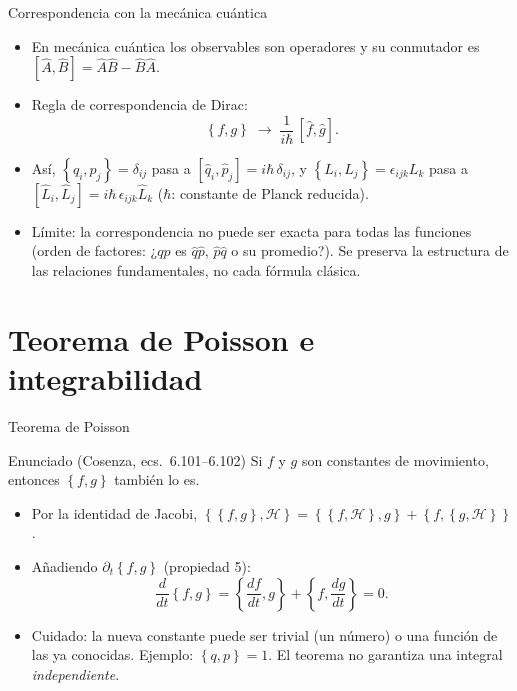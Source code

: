 \documentclass[spanish]{beamer}
\newcommand{\Ham}{\mathcal{H}}
\newcommand{\pb}[2]{\left\{#1,#2\right\}}   %
\begin{document}
\begin{frame}{Correspondencia con la mecánica cuántica}
\begin{itemize}
  \item<1-> En mecánica cuántica los observables son operadores y su conmutador es
        $[\hat A,\hat B] = \hat A\hat B - \hat B\hat A$.
  \item<2-> Regla de correspondencia de Dirac:
  \[
    \pb{f}{g} \;\longrightarrow\; \frac{1}{i\hbar}\,[\hat f,\hat g] .
  \]
  \item<3-> Así, $\pb{q_i}{p_j} = \delta_{ij}$ pasa a
        $[\hat q_i,\hat p_j] = i\hbar\,\delta_{ij}$, y
        $\pb{L_i}{L_j} = \epsilon_{ijk}L_k$ pasa a
        $[\hat L_i,\hat L_j] = i\hbar\,\epsilon_{ijk}\hat L_k$
        ($\hbar$: constante de Planck reducida).
  \item<4-> \alert{Límite:} la correspondencia no puede ser exacta para todas las
        funciones (orden de factores: ¿$qp$ es $\hat q\hat p$, $\hat p\hat q$ o su
        promedio?). Se preserva la estructura de las relaciones fundamentales,
        no cada fórmula clásica.
\end{itemize}
\end{frame}

\section{Teorema de Poisson e integrabilidad}

\begin{frame}{Teorema de Poisson}
\begin{block}{Enunciado (Cosenza, ecs.~6.101--6.102)}
Si $f$ y $g$ son constantes de movimiento, entonces $\pb{f}{g}$ también lo es.
\end{block}
\begin{itemize}
  \item<2-> Por la identidad de Jacobi,
        $\pb{\pb{f}{g}}{\Ham} = \pb{\pb{f}{\Ham}}{g} + \pb{f}{\pb{g}{\Ham}}$.
  \item<3-> Añadiendo $\partial_t\pb{f}{g}$ (propiedad 5):
  \[
    \frac{d}{dt}\pb{f}{g} = \pb{\frac{df}{dt}}{g} + \pb{f}{\frac{dg}{dt}} = 0 .
  \]
  \item<4-> \alert{Cuidado:} la nueva constante puede ser trivial (un número) o una
        función de las ya conocidas. Ejemplo: $\pb{q}{p}=1$.
        El teorema no garantiza una integral \emph{independiente}.
\end{itemize}
\end{frame}
\end{document}
